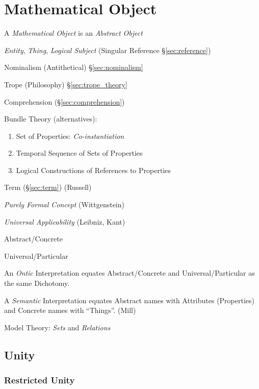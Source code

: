 \section{Mathematical Object}\label{sec:mathematical_object}
\cite{laycock10}

A \emph{Mathematical Object} is an \emph{Abstract Object}

\emph{Entity}, \emph{Thing}, \emph{Logical Subject} (Singular
Reference \S\ref{sec:reference})

Nominalism (Antithetical) \S\ref{sec:nominalism}

Trope (Philosophy) \S\ref{sec:trope_theory}

Comprehension (\S\ref{sec:comprehension})

Bundle Theory (alternatives):
\begin{enumerate}
  \item Set of Properties: \emph{Co-instantiation}
  \item Temporal Sequence of Sets of Properties
  \item Logical Constructions of References to Properties
\end{enumerate}

Term (\S\ref{sec:term}) (Russell)

\emph{Purely Formal Concept} (Wittgenstein)

\emph{Universal Applicability} (Leibniz, Kant)

Abstract/Concrete

Universal/Particular

An \emph{Ontic} Interpretation equates Abstract/Concrete and
Universal/Particular as the same Dichotomy.

A \emph{Semantic} Interpretation equates Abstract names with
Attributes (Properties) and Concrete names with ``Things''. (Mill)

Model Theory: \emph{Sets} and \emph{Relations}



\subsection{Unity}\label{sec:unity}

\subsubsection{Restricted Unity}\label{sec:restricted_unity}


